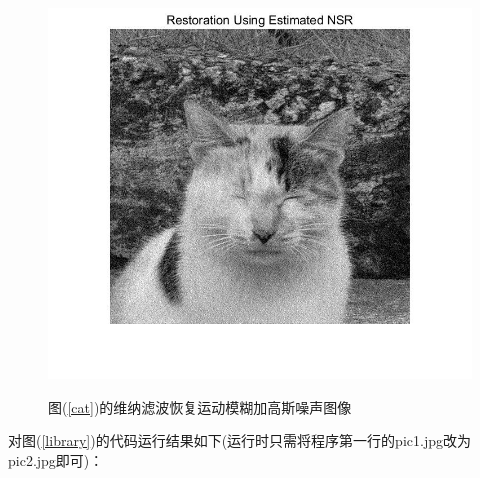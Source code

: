 \documentclass[UTF8]{ctexart}
\begin{document}
\begin{figure}[htbp]
{            \includegraphics[scale=0.31]{pic1-2.2.2-3.jpg}
        }
        \caption{图(\ref{cat})的维纳滤波恢复运动模糊加高斯噪声图像}
        \label{catweina2}
    \end{figure}
    \clearpage
    对图(\ref{library})的代码运行结果如下(运行时只需将程序第一行的{\ttfamily pic1.jpg}改为{\ttfamily pic2.jpg}即可)：
\end{document}
